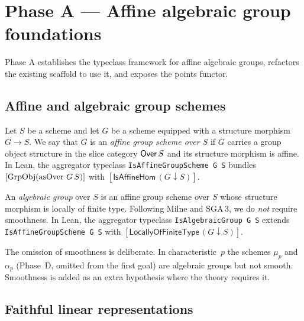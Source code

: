 \chapter{Phase A --- Affine algebraic group foundations}

Phase A establishes the typeclass framework for affine algebraic groups,
refactors the existing scaffold to use it, and exposes the points functor.

\section{Affine and algebraic group schemes}

\begin{definition}\label{def:affine-group-scheme}
\leanok
{}
Let $S$ be a scheme and let $G$ be a scheme equipped with a structure morphism
$G \to S$. We say that $G$ is an \emph{affine group scheme over $S$} if
$G$ carries a group object structure in the slice category $\mathsf{Over}\,S$ and
its structure morphism is affine. In Lean, the aggregator typeclass
\texttt{IsAffineGroupScheme G S} bundles
$[\operatorname{GrpObj}(\operatorname{asOver}\,G\,S)]$ with $[\mathsf{IsAffineHom}\,(G \downarrow S)]$.
\end{definition}

\begin{definition}\label{def:algebraic-group}
\leanok
{}
An \emph{algebraic group} over $S$ is an affine group scheme over $S$ whose
structure morphism is locally of finite type. Following Milne and
SGA\,3, we do \emph{not} require smoothness.
In Lean, the aggregator typeclass \texttt{IsAlgebraicGroup G S} extends
\texttt{IsAffineGroupScheme G S} with
$[\mathsf{LocallyOfFiniteType}\,(G \downarrow S)]$.
\end{definition}

\begin{remark}\label{rem:no-smoothness}
The omission of smoothness is deliberate. In characteristic~$p$ the schemes
$\mu_p$ and $\alpha_p$ (Phase~D, omitted from the first goal) are algebraic
groups but not smooth. Smoothness is added as an extra hypothesis where the
theory requires it.
\end{remark}

\section{Faithful linear representations}

